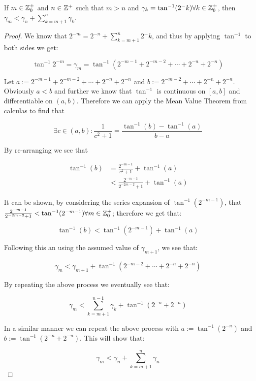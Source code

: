 {%
\begin{Cordic Gamma Property}
\label{THM_"Cordic Gamma Property"}
If \(m \in \mathbb{Z}^+_0\) and \(n \in \mathbb{Z}^+\) such that \(m > n\) and \(\gamma_k = \tan^{-1}(2^-k) \forall k \in \mathbb{Z}^+_0\), then \(\gamma_m < \gamma_n + \sum_{k=m+1}^n \gamma_k\).
\end{Cordic Gamma Property}
\begin{proof}
We know that \(2^{-m} = 2^{-n} + \sum_{k=m+1}^n 2^-k\), and thus by applying \(\tan^{-1}\) to both sides we get:

\[\tan^{-1} 2^{-m} = \gamma_m = \tan^{-1}(2^{-m-1} + 2^{-m-2} + \cdots + 2^{-n} + 2^{-n})\]

Let \(a := 2^{-m-1} + 2^{-m-2} + \cdots + 2^{-n} + 2^{-n}\) and \(b := 2^{-m-2} + \cdots + 2^{-n} + 2^{-n}\). Obviously \(a < b\) and further we know that \(\tan^{-1}\) is continuous on \([a,b]\) and differentiable on \((a,b)\). Therefore we can apply the Mean Value Theorem from calculas to find that 

\[\exists c \in (a,b) : \frac{1}{c^2 + 1} = \frac{\tan^{-1}(b) - \tan^{-1}(a)}{b-a}\]

By re-arranging we see that 

\begin{align*}
	\tan^{-1}(b) &= \frac{2^{-m-1}}{c^2 + 1} + \tan^{-1}(a)\\
		&< \frac{2^{-m-1}}{2^{-2m-2} + 1} + \tan^{-1}(a)
\end{align*}

It can be shown, by considering the series expansion of \(\tan^{-1}(2^{-m-1})\), that \(\frac{2^{-m-1}}{2^{-2m-2} + 1} < \tan^{-1}(2^{-m-1}) \forall m \in \mathbb{Z}^+_0\); therefore we get that:

\[\tan^{-1}(b) < \tan^{-1}(2^{-m-1}) + \tan^{-1}(a)\]

Following this an using the assumed value of \(\gamma_{m+1}\), we see that:

\[\gamma_m < \gamma_{m+1} + \tan^{-1}(2^{-m-2} + \cdots + 2^{-n} + 2^{-n})\]

By repeating the above process we eventually see that:

\[\gamma_m < \sum_{k=m+1}^{n-1} \gamma_k + \tan^{-1}(2^{-n} + 2^{-n})\]

In a similar manner we can repeat the above process with \(a := \tan^{-1}(2^{-n})\) and \(b := \tan^{-1}(2^{-n} + 2^{-n})\). This will show that:

\begin{displaymath}
	\gamma_m < \gamma_n + \sum_{k=m+1}^{n}\gamma_n
\end{displaymath}


\end{proof}}
